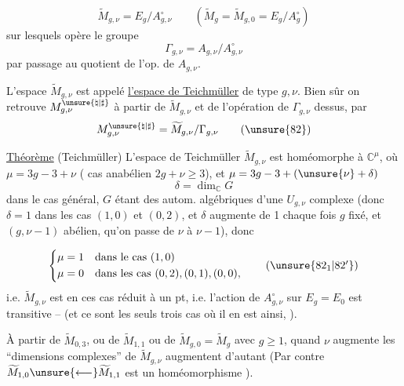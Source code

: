 \[
 \widetilde M_{g,\nu}=E_g/A_{g,\nu}^{\circ}
 \qquad
 (\widetilde M_g=\widetilde M_{g,0}=E_g/A_g^{\circ})
 \tag{81}
\]
sur lesquels opère le groupe 
\[
 \Gamma_{g,\nu}=A_{g,\nu}/A_{g,\nu}^{\circ}
\]
par passage au quotient de l'op. de \(A_{g,\nu}\).

 L'espace \(\widetilde M_{g,\nu}\)  est appelé \uline{l'espace de Teichmüller} de type \(g,\nu\). Bien sûr on retrouve \(M_{g,\nu}^{\unsure{\natural|\sharp}}\) à partir de \(\widetilde M_{g,\nu}\) et  de l'opération de \(\Gamma_{g,\nu}\) dessus, par
\[
 M_{g,\nu}^{\unsure{\natural|\sharp}}=\widetilde M_{g,\nu}/\Gamma_{g,\nu}
 \tag{\unsure{82}}
\]

\uline{Théorème} (Teichmüller) L'espace de Teichmüller \(\widetilde M_{g,\nu}\) est homéomorphe à  \(\mathbb C^\mu\), où \(\mu=3g-3+\nu\) ( cas anabélien \(2g+\nu\geq 3\)), et \(\mu=3g-3+(\unsure{\nu}+\delta)\)
\[
 \delta=\dim_{\mathbb C}G
\]
dans le cas général, \(G\) étant  des autom. algébriques d'une \(U_{g,\nu}\) complexe (donc \(\delta=1\) dans les cas  \((1,0)\) et \((0,2)\), et  \(\delta\) augmente de 1 chaque fois  \(g\) fixé, et \((g,\nu-1)\) abélien, qu'on passe de \(\nu\) à \(\nu-1\)), donc


\[
 \left\{
 \begin{aligned}
 \mu&=1\quad\text{dans le cas }(1,0)\\
 \mu&=0\quad\text{dans les cas }(0,2),(0,1),(0,0),
 \end{aligned}
 \right.
 \tag{\unsure{\(82_1\)|\(82'\)}}
\]
i.e. \(\widetilde M_{g,\nu}\) est en ces cas réduit à un pt, i.e. l'action de \(A_{g,\nu}^{\circ}\) sur \(E_g=E_0\) est  transitive -- (et ce sont  les seuls trois cas où il en est ainsi, ).


À partir de \(\widetilde M_{0,3}\), ou de \(\widetilde M_{1,1}\) ou de \(\widetilde M_{g,0}=\widetilde M_g\) avec \(g\geq 1\), quand \(\nu\) augmente les ``dimensions complexes'' de \(\widetilde M_{g,\nu}\) augmentent d'autant (Par contre \(\widetilde M_{1,0}\unsure{\longleftarrow}\widetilde M_{1,1}\) est un homéomorphisme ).

